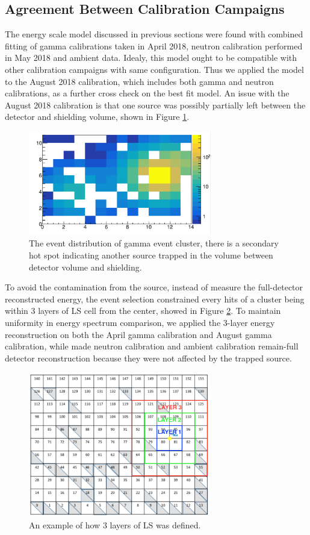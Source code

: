 \subsection{Agreement Between Calibration Campaigns}
The energy scale model discussed in previous sections were found with combined fitting of gamma calibrations taken in April 2018, neutron calibration performed in May 2018 and ambient data. 
Idealy, this model ought to be compatible with other calibration campaigns with same configuration. 
Thus we applied the model to the August 2018 calibration, which includes both gamma and neutron calibrations, as a further cross check on the best fit model.
An issue with the August 2018 calibration is that one source was possibly partially left between the detector and shielding volume, shown in Figure \ref{fig:left}.

\begin{figure}[h!]
\centering
\includegraphics[width=80mm]{Figures/secondhotspot.png}
\caption{The event distribution of gamma event cluster, there is a secondary hot spot indicating another source trapped in the volume between detector volume and shielding.}
\label{fig:left}
\end{figure}

To avoid the contamination from the source, instead of measure the full-detector reconstructed energy, the event selection constrained every hits of a cluster being within 3 layers of LS cell from the center, showed in Figure \ref{fig:ring}.
To maintain uniformity in energy spectrum comparison, we applied the 3-layer energy reconstruction on both the April gamma calibration and August gamma calibration, while made neutron calibration and ambient calibration remain-full detector reconstruction because they were not affected by the trapped source.

\begin{figure}[h!]
\centering
\includegraphics[width=80mm]{Figures/Ring.png}
\caption{An example of how 3 layers of LS was defined.}
\label{fig:ring}
\end{figure}

